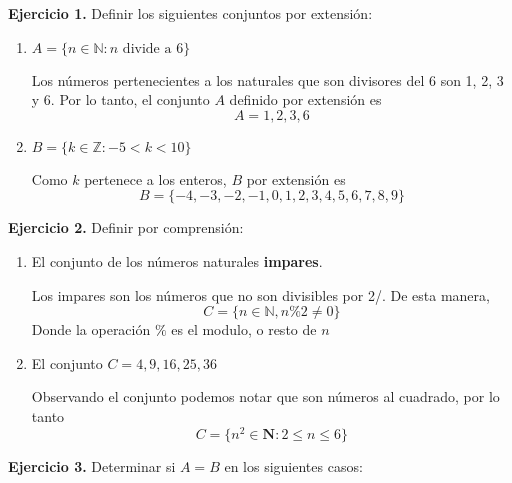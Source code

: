 \textbf{Ejercicio 1.} Definir los siguientes conjuntos por extensión:

\begin{enumerate}
	\item $A = \{n \in \mathbb{N}: n \text{ divide a } 6\}$
	
	Los n\'umeros pertenecientes a los naturales que son divisores del 6 son 1, 2, 3 y 6. Por lo tanto, el conjunto $A$ definido por extensi\'on es $$A = {1, 2, 3, 6}$$
	
	\item $B = \{ k \in \mathbb{Z}: -5 < k < 10 \}$
	
	Como $k$ pertenece a los enteros, $B$ por extensi\'on es $$B = \{ -4, -3, -2, -1, 0, 1, 2, 3, 4, 5, 6, 7, 8, 9 \}$$
\end{enumerate}

\textbf{Ejercicio 2.} Definir por comprensión:

\begin{enumerate}
	\item El conjunto de los números naturales \textbf{impares}.
	
	Los impares son los n\'umeros que no son divisibles por 2/. De esta manera, $$C = \{ n \in \mathbb{N}, n \% 2 \neq 0\}$$ Donde la operaci\'on $\%$ es el modulo, o resto de $n$
	
	\item El conjunto $C = {4, 9, 16, 25, 36}$
	
	Observando el conjunto podemos notar que son n\'umeros al cuadrado, por lo tanto $$ C = \{ n^2 \in \mathbf{N} : 2 \leq n \leq 6 \}$$
\end{enumerate}

\textbf{Ejercicio 3.} Determinar si $A = B$ en los siguientes casos:

